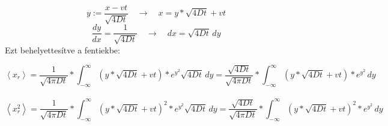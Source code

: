 \begin{equation*}
    y := \frac{x - vt}{\sqrt{4Dt}} \quad \to \quad x = y * \sqrt{4Dt} + vt
\end{equation*}
\begin{equation*}
    \frac{dy}{dx} = \frac{1}{\sqrt{4Dt}} \quad \to \quad dx = \sqrt{4Dt}\, dy
\end{equation*}
Ezt behelyettesítve a fentiekbe:

\begin{equation}
    \left< x_{r} \right>
    =
    \frac{1}{\sqrt{4 \pi D t}} * \int_{- \infty}^{\infty} \left ( y * \sqrt{4Dt} + vt \right) * e^{y^{2}} \sqrt{4Dt}\, dy
    =
    \frac{\sqrt{4Dt}}{\sqrt{4 \pi D t}} * \int_{- \infty}^{\infty} \left ( y * \sqrt{4Dt} + vt \right) * e^{y^{2}}\, dy
\end{equation}
\\
\begin{equation}
    \left< x_{r}^{2} \right>
    =
    \frac{1}{\sqrt{4 \pi D t}} * \int_{- \infty}^{\infty} \left ( y * \sqrt{4Dt} + vt \right)^{2} * e^{y^{2}} \sqrt{4Dt}\, dy
    =
    \frac{\sqrt{4Dt}}{\sqrt{4 \pi D t}} * \int_{- \infty}^{\infty} \left ( y * \sqrt{4Dt} + vt \right)^{2} * e^{y^{2}}\, dy
\end{equation}